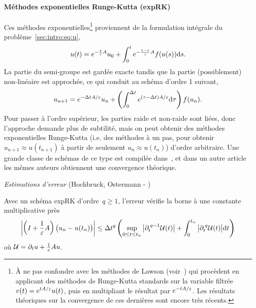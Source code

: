 

\paragraph{Méthodes exponentielles Runge-Kutta (expRK)\\}

Ces méthodes exponentielles\footnote{À ne pas confondre avec les méthodes de Lawson (voir~\cite{lawson.1967.generalized,hochbruck.2020.convergence}) qui procèdent en applicant des méthodes de Runge-Kutta standards sur la variable filtrée $v(t) = e^{t A/\varepsilon}u(t)$, puis en multipliant le résultat par $e^{-t A/\varepsilon}$. Les résultats théoriques sur la convergence de ces dernières sont encore très récents.} proviennent de la formulation intégrale du problème~\eqref{sec:intro:eq:u}, 
\begin{equation*}
    u(t) = e^{-\frac{t}{\varepsilon}A}u_0 + \int_0^t e^{-\frac{t-\tau}{\varepsilon}A} f(u(s)) \mathrm{d} s .
\end{equation*}
La partie du semi-groupe est gardée exacte tandis que la partie (possiblement) non-linéaire est approchée, ce qui conduit au schéma d'ordre 1 suivant,
\begin{equation} \label{sec:intro:eq:expEuler}
    u_{n+1} = e^{-\Delta t A/\varepsilon} u_n + \left(\int_0^{\Delta t} e^{(\tau-\Delta t) A/\varepsilon} \mathrm{d}\tau \right) f(u_n) .
\end{equation}
Pour passer à l'ordre supérieur, les parties raide et non-raide sont liées, donc l'approche demande plus de subtilité, mais on peut obtenir des méthodes exponentielles Runge-Kutta (i.e. des méthodes à un pas, pour obtenir $u_{n+1} \approx u(t_{n+1})$ à partir de seulement $u_n \approx u(t_n)$) d'ordre arbitraire. Une grande classe de schémas de ce type est compilée dans~\cite{hochbruck.2005.explicit}, et dans un autre article les mêmes auteurs obtiennent une convergence théorique. 

\medskip\noindent%
\textit{Estimations d'erreur} (Hochbruck, Ostermann - \cite{hochbruck.2004.exponential})

Avec un schéma expRK d'ordre~$q \geq 1$, l'erreur vérifie la borne à une constante multiplicative près
\begin{equation*}
    \left| 
        \left( I + \frac{1}{\varepsilon}A \right) \big( u_n - u(t_n) \big) 
    \right|
    \leq \Delta t^{q} \left( 
        \sup_{0 \leq t \leq t_n} \big| \partial_t^{\: q-1} \mathcal{U}(t) \big| 
        + \int_0^{t_n} \big| \partial_t^{\: q} \mathcal{U}(t) \big| \mathrm{d} t 
    \right) 
\end{equation*}
où $\mathcal{U} = \partial_t u + \frac{1}{\varepsilon}Au$. 

